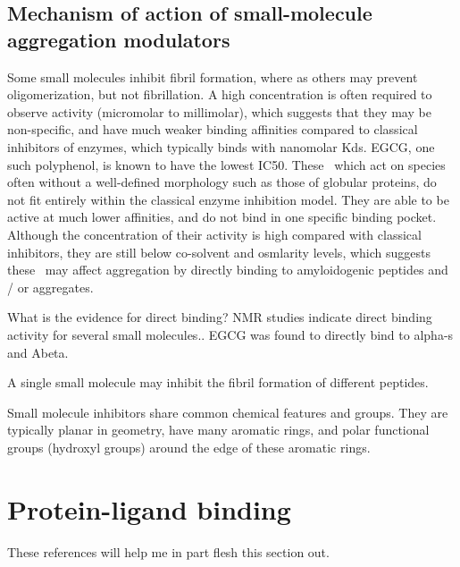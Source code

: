 \subsection{Mechanism of action of small-molecule aggregation modulators}
Some small molecules inhibit fibril formation, where as others may prevent oligomerization, but not fibrillation. A high concentration is often required to observe activity (micromolar to millimolar), which suggests that they may be non-specific, and have much weaker binding affinities compared to classical inhibitors of enzymes, which typically binds with nanomolar Kds. EGCG, one such polyphenol, is known to have the lowest IC50.  These \smi\ which act on species often without a well-defined morphology such as those of globular proteins, do not fit entirely within the classical enzyme inhibition model. They are able to be active at much lower affinities, and do not bind in one specific binding pocket.  Although the concentration of their activity is high compared with classical inhibitors,  they are still below co-solvent and osmlarity levels, which suggests these \smi\ may affect aggregation by directly binding to amyloidogenic peptides and / or aggregates.

What is the evidence for direct binding? NMR studies indicate direct binding activity for several small molecules.\cite{XXX EGCG paper nature 2007}.  EGCG was found to directly bind to alpha-s and Abeta.

A single small molecule may inhibit the fibril formation of different peptides.

Small molecule inhibitors share common chemical features and groups.  They are typically planar in geometry, have many aromatic rings, and polar functional groups (hydroxyl groups) around the edge of these aromatic rings.\cite{Stempler:2011dy,Shoval:2007p3547,Porat:2006fn,Lemkul:2012da}

\section{Protein-ligand binding}
These references will help me in part flesh this section out.\cite{Lu:2010jh,Kortagere:2010fc,Nunez:2012il,Copeland:2011dl,Prinz:2008kr,Sikazwe:2012gu,Copeland:2006bb}

